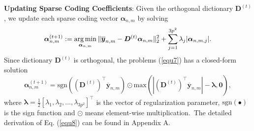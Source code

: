 \vspace{2mm}
\textbf{Updating Sparse Coding Coefficients}: Given the orthogonal dictionary $\bm{D}^{(t)}$, we update each sparse coding vector $\bm{\alpha}_{n,m}$ by solving
\vspace{-2mm}
\begin{equation}\label{equ7}
\vspace{-2mm}
\begin{split}
\bm{\alpha}_{n,m}^{(t+1)}:=\argmin_{\bm{\alpha}_{n,m}}
\|\bm{\overline{y}}_{n,m}-\bm{D}^{(t)}\bm{\alpha}_{n,m}\|_{2}^{2}+\sum_{j=1}^{3p^{2}}\lambda_{j}|\bm{\alpha}_{n,m,j}|.
\end{split}
\end{equation}
Since dictionary $\bm{D}^{(t)}$ is orthogonal, the problems (\ref{equ7}) has a closed-form solution
\vspace{-2mm}
\begin{equation}\label{equ8}
\bm{\alpha}_{n,m}^{(t+1)}= \text{sgn}((\bm{D}^{(t)})^{\top}\bm{\overline{y}}_{n,m})\odot \text{max}(|(\bm{D}^{(t)})^{\top}\bm{\overline{y}}_{n,m}|-\bm{\lambda},\bm{0}),
\end{equation}
where $\bm{\lambda} = \frac{1}{2}[\lambda_{1},\lambda_{2},...,\lambda_{3p^2}]^{\top}$ is the vector of regularization parameter, $\text{sgn}(\bullet)$ is the sign function and $\odot$ means element-wise multiplication.\ The detailed derivation of Eq. (\ref{equ8}) can be found in Appendix A.
 
